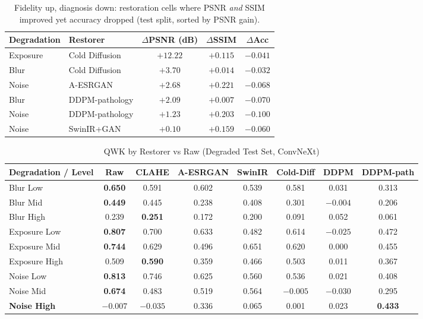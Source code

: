 \documentclass[conference]{IEEEtran}
\begin{document}
\begin{table}[htbp]
\caption{Fidelity up, diagnosis down: restoration cells where PSNR \textit{and} SSIM improved yet accuracy dropped (test split, sorted by PSNR gain).}
\begin{center}
\begin{tabular}{llccc}
\toprule
\textbf{Degradation} & \textbf{Restorer} & \textbf{$\Delta$PSNR (dB)} & \textbf{$\Delta$SSIM} & \textbf{$\Delta$Acc} \\
\midrule
Exposure & Cold Diffusion & $+12.22$ & $+0.115$ & $-0.041$ \\
Blur & Cold Diffusion & $+3.70$ & $+0.014$ & $-0.032$ \\
Noise & A-ESRGAN & $+2.68$ & $+0.221$ & $-0.068$ \\
Blur & DDPM-pathology & $+2.09$ & $+0.007$ & $-0.070$ \\
Noise & DDPM-pathology & $+1.23$ & $+0.203$ & $-0.100$ \\
Noise & SwinIR+GAN & $+0.10$ & $+0.159$ & $-0.060$ \\
\bottomrule
\end{tabular}
\label{tab:fidelity_paradox}
\end{center}
\end{table}

\begin{table}[htbp]
\caption{QWK by Restorer vs Raw (Degraded Test Set, ConvNeXt)}
\begin{center}
\begin{tabular}{lccccccc}
\toprule
\textbf{Degradation / Level} & \textbf{Raw} & \textbf{CLAHE} & \textbf{A-ESRGAN} & \textbf{SwinIR} & \textbf{Cold-Diff} & \textbf{DDPM} & \textbf{DDPM-path} \\
\midrule
Blur Low & \textbf{0.650} & 0.591 & 0.602 & 0.539 & 0.581 & 0.031 & 0.313 \\
Blur Mid & \textbf{0.449} & 0.445 & 0.238 & 0.408 & 0.301 & $-0.004$ & 0.206 \\
Blur High & 0.239 & \textbf{0.251} & 0.172 & 0.200 & 0.091 & 0.052 & 0.061 \\
Exposure Low & \textbf{0.807} & 0.700 & 0.633 & 0.482 & 0.614 & $-0.025$ & 0.472 \\
Exposure Mid & \textbf{0.744} & 0.629 & 0.496 & 0.651 & 0.620 & 0.000 & 0.455 \\
Exposure High & 0.509 & \textbf{0.590} & 0.359 & 0.466 & 0.503 & 0.011 & 0.367 \\
Noise Low & \textbf{0.813} & 0.746 & 0.625 & 0.560 & 0.536 & 0.021 & 0.408 \\
Noise Mid & \textbf{0.674} & 0.483 & 0.519 & 0.564 & $-0.005$ & $-0.030$ & 0.295 \\
\textbf{Noise High} & $-0.007$ & $-0.035$ & 0.336 & 0.065 & 0.001 & 0.023 & \textbf{0.433} \\
\bottomrule
\end{tabular}
\label{tab:qwk_recovery}
\end{center}
\end{table}
\end{document}
